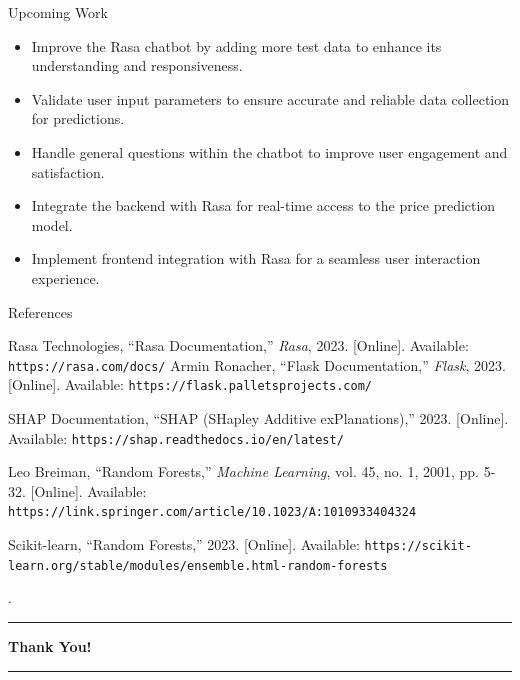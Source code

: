 \documentclass{beamer}
\begin{document}
\begin{frame}{Upcoming Work}
    \begin{itemize}
        \item Improve the Rasa chatbot by adding more test data to enhance its understanding and responsiveness.
        \item Validate user input parameters to ensure accurate and reliable data collection for predictions.
        \item Handle general questions within the chatbot to improve user engagement and satisfaction.
        \item Integrate the backend with Rasa for real-time access to the price prediction model.
        \item Implement frontend integration with Rasa for a seamless user interaction experience.
    \end{itemize}
\end{frame}


\begin{frame}[t]{References}
\begin{thebibliography}{9}

Rasa Technologies, ``Rasa Documentation,'' \textit{Rasa}, 2023. [Online]. Available: \texttt{https://rasa.com/docs/}
Armin Ronacher, ``Flask Documentation,'' \textit{Flask}, 2023. [Online]. Available: \texttt{https://flask.palletsprojects.com/}


SHAP Documentation, ``SHAP (SHapley Additive exPlanations),'' 2023. [Online]. Available: \texttt{https://shap.readthedocs.io/en/latest/}

Leo Breiman, ``Random Forests,'' \textit{Machine Learning}, vol. 45, no. 1, 2001, pp. 5-32. [Online]. Available: \texttt{https://link.springer.com/article/10.1023/A:1010933404324}

Scikit-learn, ``Random Forests,'' 2023. [Online]. Available: \texttt{https://scikit-learn.org/stable/modules/ensemble.html-random-forests}



\end{thebibliography}
\end{frame}



\begin{frame}[t]{.}
    \centering
    \vspace{1cm}
    \textbf{\Huge{}}
    
    \vspace{0.5cm}
    \rule{0.5\textwidth}{0.5mm} %

    \vspace{1cm}
    \textbf{\Large{Thank You!}}

    \vspace{0.5cm}
    \rule{0.5\textwidth}{0.5mm} %
\end{frame}
\end{document}

